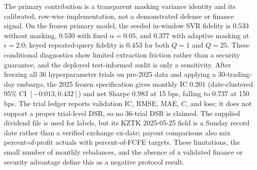 \documentclass[pdflatex,sn-mathphys-num]{sn-jnl}
\theoremstyle{thmstyleone}
\theoremstyle{thmstyletwo}
\theoremstyle{thmstylethree}
\begin{document}
The primary contribution is a transparent masking variance identity and its calibrated, row-wise implementation, not a demonstrated defense or finance signal. On the frozen primary model, the seeded in-window SVR fidelity is $0.533$ without masking, $0.530$ with fixed $\alpha=0.05$, and $0.377$ with adaptive masking at $\epsilon=2.0$; keyed repeated-query fidelity is $0.453$ for both $Q=1$ and $Q=25$. These conditional diagnostics show limited extraction friction rather than a security guarantee, and the deployed test-informed audit is only a sensitivity. After freezing all 36 hyperparameter trials on pre-2025 data and applying a 30-trading-day embargo, the 2025 frozen specification gives monthly IC $0.201$ (date-clustered 95\% CI $[-0.013,0.432]$) and net Sharpe $0.983$ at 15 bps, falling to $0.737$ at 150 bps. The trial ledger reports validation IC, RMSE, MAE, $C$, and loss; it does not support a proper trial-level DSR, so no 36-trial DSR is claimed. The supplied dividend file is used for labels, but its KZTK 2025-05-25 field is a Sunday record date rather than a verified exchange ex-date; payout comparisons also mix percent-of-profit actuals with percent-of-FCFE targets. These limitations, the small number of monthly rebalances, and the absence of a validated finance or security advantage define this as a negative protocol result.
\end{document}
